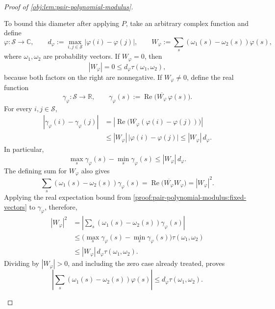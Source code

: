 \begin{proof}[Proof of \cref{obj:lem:pair-polynomial-modulus}]
\begin{enumerate}
To bound this diameter after applying \(P\), take an arbitrary complex function and define
\[
\varphi:\mathcal S\to\mathbb C,\qquad
d_\varphi:=\max_{i,j\in\mathcal S}|\varphi(i)-\varphi(j)|,
\qquad
W_\varphi:=\sum_s(\omega_1(s)-\omega_2(s))\varphi(s),
\]
where \(\omega_1,\omega_2\) are probability vectors.
If \(W_\varphi=0\), then
\[
|W_\varphi|=0\le d_\varphi\tau(\omega_1,\omega_2),
\]
because both factors on the right are nonnegative.
If \(W_\varphi\ne0\), define the real function
\[
\gamma_\varphi:\mathcal S\to\mathbb R,\qquad
\gamma_\varphi(s):=
\operatorname{Re}\bigl(\overline{W_\varphi}\,\varphi(s)\bigr).
\]
For every \(i,j\in\mathcal S\),
\[
\begin{aligned}
|\gamma_\varphi(i)-\gamma_\varphi(j)|
&=\left|\operatorname{Re}
  \bigl(\overline{W_\varphi}(\varphi(i)-\varphi(j))\bigr)\right|\\
&\le |W_\varphi|\,|\varphi(i)-\varphi(j)|
\le |W_\varphi|\,d_\varphi.
\end{aligned}
\]
In particular,
\[
\max_s\gamma_\varphi(s)-\min_s\gamma_\varphi(s)
\le |W_\varphi|\,d_\varphi.
\]
The defining sum for \(W_\varphi\) also gives
\[
\sum_s(\omega_1(s)-\omega_2(s))\gamma_\varphi(s)
=\operatorname{Re}\bigl(\overline{W_\varphi}W_\varphi\bigr)
=|W_\varphi|^2.
\]
Applying the real expectation bound from \cref{proof:pair-polynomial-modulus:fixed-vectors} to
\(\gamma_\varphi\), therefore,
\[
\begin{aligned}
|W_\varphi|^2
&=\left|\sum_s(\omega_1(s)-\omega_2(s))\gamma_\varphi(s)\right|\\
&\le
\bigl(\max_s\gamma_\varphi(s)-\min_s\gamma_\varphi(s)\bigr)
\tau(\omega_1,\omega_2)\\
&\le |W_\varphi|\,d_\varphi\tau(\omega_1,\omega_2).
\end{aligned}
\]
Dividing by \(|W_\varphi|>0\), and including the zero case already treated, proves
\[
\left|\sum_s(\omega_1(s)-\omega_2(s))\varphi(s)\right|
\le d_\varphi\tau(\omega_1,\omega_2).
\]


\end{enumerate}
\end{proof}
